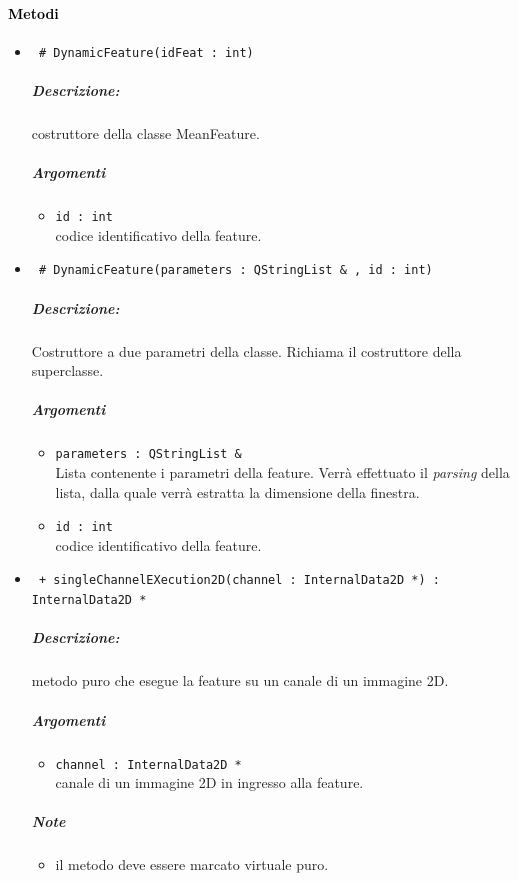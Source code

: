 \paragraph{\textcolor{black}{Metodi\\}}
	\begin{itemize}
	\item \color{blue}\verb! # DynamicFeature(idFeat : int)!
		\color{black}
		\subparagraph{Descrizione:} costruttore della classe MeanFeature.
		\subparagraph{Argomenti}
			\begin{itemize}
				\item \color{RoyalPurple} \verb!id : int! \\ 
				\color{black} codice identificativo della feature\g{}.	
			\end{itemize}
			
	\item \color{blue}\verb! # DynamicFeature(parameters : QStringList & , id : int)!
		\color{black}
		\subparagraph{Descrizione:} Costruttore a due parametri della classe. Richiama il costruttore della 						superclasse.
		\subparagraph{Argomenti}
			\begin{itemize}	
				\item \color{RoyalPurple} \verb!parameters : QStringList &! \\ 
				\color{black} Lista contenente i parametri della feature\g{}. Verrà effettuato il \textit{parsing} 						della lista, dalla quale verrà estratta la dimensione della finestra.
				\item \color{RoyalPurple} \verb!id : int! \\ 
				\color{black} codice identificativo della feature\g{}.	
			\end{itemize}

	\item \color{blue}\verb! + singleChannelEXecution2D(channel : InternalData2D *) : InternalData2D *!
		\color{black}
		\subparagraph{Descrizione:} metodo puro che esegue la feature su un canale di un immagine 2D.
		\subparagraph{Argomenti}
			\begin{itemize}
				\item \color{RoyalPurple} \verb!channel : InternalData2D * ! \\ 
				\color{black} canale di un immagine 2D in ingresso alla feature.		
			\end{itemize}
		\subparagraph{Note}
			\begin{itemize}
				\item il metodo deve essere marcato virtuale puro.
			\end{itemize}
			

\end{itemize}
